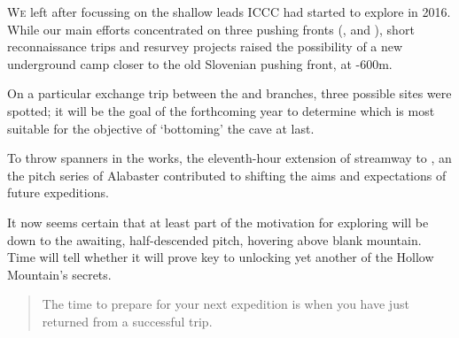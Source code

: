 \newpage
 \thispagestyle{endchapter}
\begin{tcolorbox}
	\vspace{80pt}
	\lettrine{W}{e} left  after focussing on the shallow leads ICCC had started to explore in 2016. While our main efforts concentrated on three pushing fronts (,  and ), short reconnaissance trips and resurvey projects raised the possibility of a new underground camp closer to the old Slovenian pushing front, at -600m. 
	
	On a particular exchange trip between the  and  branches, three possible sites were spotted; it will be the goal of the forthcoming year to determine which is most suitable for the objective of `bottoming' the cave at last. 

	To throw spanners in the works, the eleventh-hour extension of  streamway to , an the pitch series of Alabaster contributed to shifting the aims and expectations of future expeditions. 
	
	It now seems certain that at least part of the motivation for exploring  will be down to the awaiting, half-descended pitch, hovering above blank mountain. Time will tell whether it will prove key to unlocking yet another of the Hollow Mountain's secrets.
	
	\mydelimiter
	
	\begin{quote} The time to prepare for your next expedition is when you have just returned from a successful trip. 
	
	  \end{quote}

\end{tcolorbox}

